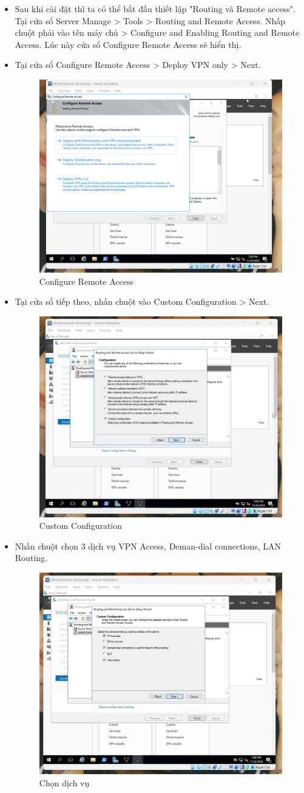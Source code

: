 \begin{itemize}
\newpage
\item Sau khi cài đặt thì ta có thể bắt đầu thiết lập "Routing và Remote access". Tại cửa sổ Server Manage > Tools > Routing and Remote Access. Nhấp chuột phải vào tên máy chủ > Configure and Enabling Routing and Remote Access. Lúc này cửa sổ Configure Remote Access sẽ hiển thị. 
\item Tại cửa sổ Configure Remote Access > Deploy VPN only > Next.

        \begin{figure}[htbp]
        \centering
        \includegraphics[width=0.5\linewidth]{RemoteAccessVPNimg/6.png}
        \caption{Configure Remote Access}
        \end{figure}
        
\item Tại cửa sổ tiếp theo, nhấn chuột vào Custom Configuration > Next.

        \begin{figure}[htbp]
        \centering
        \includegraphics[width=0.5\linewidth]{RemoteAccessVPNimg/8.png}
        \caption{Custom Configuration}
        \end{figure}

\item Nhấn chuột chọn 3 dịch vụ VPN Access, Deman-dial connections, LAN Routing.
\newpage
        \begin{figure}[htbp]
        \centering
        \includegraphics[width=0.5\linewidth]{RemoteAccessVPNimg/click.jpg}
        \caption{Chọn dịch vụ}
        \end{figure}


\end{itemize}
